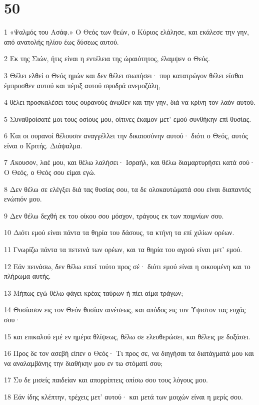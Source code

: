 \chapter{50}

\par 1 «Ψαλμός του Ασάφ.» Ο Θεός των θεών, ο Κύριος ελάλησε, και εκάλεσε την γην, από ανατολής ηλίου έως δύσεως αυτού.
\par 2 Εκ της Σιών, ήτις είναι η εντέλεια της ώραιότητος, έλαμψεν ο Θεός.
\par 3 Θέλει ελθεί ο Θεός ημών και δεν θέλει σιωπήσει· πυρ κατατρώγον θέλει είσθαι έμπροσθεν αυτού και πέριξ αυτού σφοδρά ανεμοζάλη,
\par 4 θέλει προσκαλέσει τους ουρανούς άνωθεν και την γην, διά να κρίνη τον λαόν αυτού.
\par 5 Συναθροίσατέ μοι τους οσίους μου, οίτινες έκαμον μετ' εμού συνθήκην επί θυσίας.
\par 6 Και οι ουρανοί θέλουσιν αναγγέλλει την δικαιοσύνην αυτού· διότι ο Θεός, αυτός είναι ο Κριτής. Διάψαλμα.
\par 7 Άκουσον, λαέ μου, και θέλω λαλήσει· Ισραήλ, και θέλω διαμαρτυρήσει κατά σού· Ο Θεός, ο Θεός σου είμαι εγώ.
\par 8 Δεν θέλω σε ελέγξει διά τας θυσίας σου, τα δε ολοκαυτώματά σου είναι διαπαντός ενώπιόν μου.
\par 9 Δεν θέλω δεχθή εκ του οίκου σου μόσχον, τράγους εκ των ποιμνίων σου.
\par 10 Διότι εμού είναι πάντα τα θηρία του δάσους, τα κτήνη τα επί χιλίων ορέων.
\par 11 Γνωρίζω πάντα τα πετεινά των ορέων, και τα θηρία του αγρού είναι μετ' εμού.
\par 12 Εάν πεινάσω, δεν θέλω ειπεί τούτο προς σέ· διότι εμού είναι η οικουμένη και το πλήρωμα αυτής.
\par 13 Μήπως εγώ θέλω φάγει κρέας ταύρων ή πίει αίμα τράγων;
\par 14 Θυσίασον εις τον Θεόν θυσίαν αινέσεως, και απόδος εις τον Ύψιστον τας ευχάς σου·
\par 15 και επικαλού εμέ εν ημέρα θλίψεως, θέλω σε ελευθερώσει, και θέλεις με δοξάσει.
\par 16 Προς δε τον ασεβή είπεν ο Θεός· Τι προς σε, να διηγήσαι τα διατάγματά μου και να αναλαμβάνης την διαθήκην μου εν τω στόματί σου;
\par 17 Συ δε μισείς παιδείαν και απορρίπτεις οπίσω σου τους λόγους μου.
\par 18 Εάν ίδης κλέπτην, τρέχεις μετ' αυτού· και μετά των μοιχών είναι η μερίς σου.
